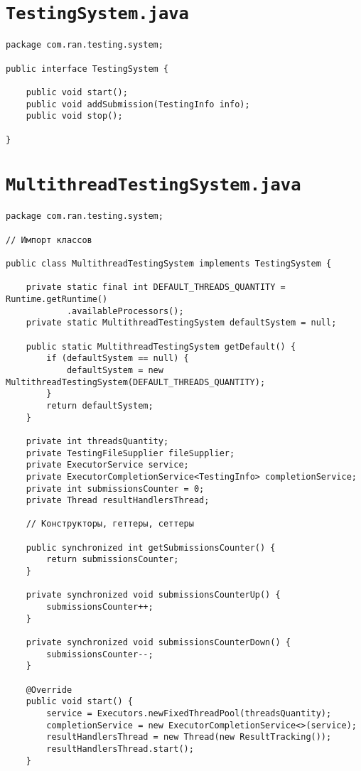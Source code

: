 \section*{\texttt{TestingSystem.java}}
\begin{verbatim}
package com.ran.testing.system;

public interface TestingSystem {
    
    public void start();
    public void addSubmission(TestingInfo info);
    public void stop();
    
}
\end{verbatim}

\section*{\texttt{MultithreadTestingSystem.java}}
\begin{verbatim}
package com.ran.testing.system;

// Импорт классов

public class MultithreadTestingSystem implements TestingSystem {

    private static final int DEFAULT_THREADS_QUANTITY = Runtime.getRuntime()
            .availableProcessors();
    private static MultithreadTestingSystem defaultSystem = null;
    
    public static MultithreadTestingSystem getDefault() {
        if (defaultSystem == null) {
            defaultSystem = new MultithreadTestingSystem(DEFAULT_THREADS_QUANTITY);
        }
        return defaultSystem;
    }
    
    private int threadsQuantity;
    private TestingFileSupplier fileSupplier;
    private ExecutorService service;
    private ExecutorCompletionService<TestingInfo> completionService;
    private int submissionsCounter = 0;
    private Thread resultHandlersThread;

    // Конструкторы, геттеры, сеттеры

    public synchronized int getSubmissionsCounter() {
        return submissionsCounter;
    }
    
    private synchronized void submissionsCounterUp() {
        submissionsCounter++;
    }
    
    private synchronized void submissionsCounterDown() {
        submissionsCounter--;
    }
    
    @Override
    public void start() {
        service = Executors.newFixedThreadPool(threadsQuantity);
        completionService = new ExecutorCompletionService<>(service);
        resultHandlersThread = new Thread(new ResultTracking());
        resultHandlersThread.start();
    }


\end{verbatim}
